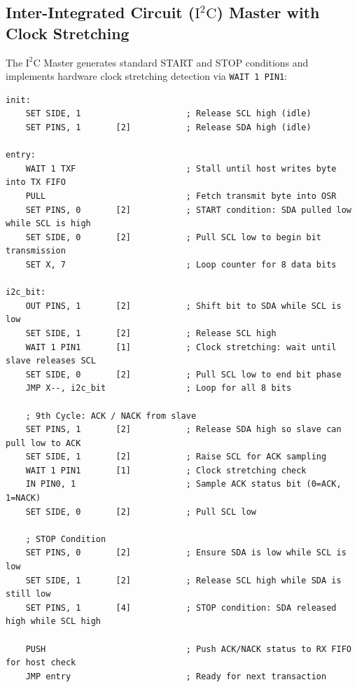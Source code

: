 \documentclass[11pt,a4paper]{article}
\begin{document}
\subsection{Inter-Integrated Circuit ($\text{I}^2\text{C}$) Master with Clock Stretching}
The $\text{I}^2\text{C}$ Master generates standard START and STOP conditions and implements hardware clock stretching detection via \texttt{WAIT 1 PIN1}:

\begin{lstlisting}[language={[x86masm]Assembler}, caption={$\text{I}^2\text{C}$ Master Microcode with Open-Drain Clock Stretching}]
init:
    SET SIDE, 1                     ; Release SCL high (idle)
    SET PINS, 1       [2]           ; Release SDA high (idle)

entry:
    WAIT 1 TXF                      ; Stall until host writes byte into TX FIFO
    PULL                            ; Fetch transmit byte into OSR
    SET PINS, 0       [2]           ; START condition: SDA pulled low while SCL is high
    SET SIDE, 0       [2]           ; Pull SCL low to begin bit transmission
    SET X, 7                        ; Loop counter for 8 data bits

i2c_bit:
    OUT PINS, 1       [2]           ; Shift bit to SDA while SCL is low
    SET SIDE, 1       [2]           ; Release SCL high
    WAIT 1 PIN1       [1]           ; Clock stretching: wait until slave releases SCL
    SET SIDE, 0       [2]           ; Pull SCL low to end bit phase
    JMP X--, i2c_bit                ; Loop for all 8 bits

    ; 9th Cycle: ACK / NACK from slave
    SET PINS, 1       [2]           ; Release SDA high so slave can pull low to ACK
    SET SIDE, 1       [2]           ; Raise SCL for ACK sampling
    WAIT 1 PIN1       [1]           ; Clock stretching check
    IN PIN0, 1                      ; Sample ACK status bit (0=ACK, 1=NACK)
    SET SIDE, 0       [2]           ; Pull SCL low

    ; STOP Condition
    SET PINS, 0       [2]           ; Ensure SDA is low while SCL is low
    SET SIDE, 1       [2]           ; Release SCL high while SDA is still low
    SET PINS, 1       [4]           ; STOP condition: SDA released high while SCL high

    PUSH                            ; Push ACK/NACK status to RX FIFO for host check
    JMP entry                       ; Ready for next transaction
\end{lstlisting}
\end{document}
